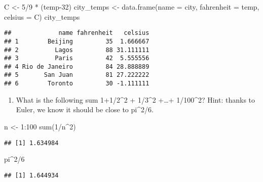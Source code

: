 \documentclass[
]{article}
\newenvironment{Shaded}{\begin{snugshade}}{\end{snugshade}}
\newcommand{\AttributeTok}[1]{\textcolor[rgb]{0.77,0.63,0.00}{#1}}
\newcommand{\DecValTok}[1]{\textcolor[rgb]{0.00,0.00,0.81}{#1}}
\newcommand{\FunctionTok}[1]{\textcolor[rgb]{0.00,0.00,0.00}{#1}}
\newcommand{\NormalTok}[1]{#1}
\newcommand{\OtherTok}[1]{\textcolor[rgb]{0.56,0.35,0.01}{#1}}
\newcommand{\SpecialCharTok}[1]{\textcolor[rgb]{0.00,0.00,0.00}{#1}}
\providecommand{\tightlist}{%
  \setlength{\itemsep}{0pt}\setlength{\parskip}{0pt}}
\begin{document}
\begin{Shaded}
\begin{Highlighting}[]
\NormalTok{C }\OtherTok{\textless{}{-}} \DecValTok{5}\SpecialCharTok{/}\DecValTok{9} \SpecialCharTok{*}\NormalTok{ (temp}\DecValTok{{-}32}\NormalTok{)}
\NormalTok{city\_temps }\OtherTok{\textless{}{-}} \FunctionTok{data.frame}\NormalTok{(}\AttributeTok{name =}\NormalTok{ city, }\AttributeTok{fahrenheit =}\NormalTok{ temp, }\AttributeTok{celsius =}\NormalTok{ C)}
\NormalTok{city\_temps}
\end{Highlighting}
\end{Shaded}

\begin{verbatim}
##             name fahrenheit   celsius
## 1        Beijing         35  1.666667
## 2          Lagos         88 31.111111
## 3          Paris         42  5.555556
## 4 Rio de Janeiro         84 28.888889
## 5       San Juan         81 27.222222
## 6        Toronto         30 -1.111111
\end{verbatim}

\begin{enumerate}
\def\labelenumi{\arabic{enumi}.}
\setcounter{enumi}{1}
\tightlist
\item
  What is the following sum 1+1/2\^{}2 + 1/3\^{}2 +\ldots+ 1/100\^{}2?
  Hint: thanks to Euler, we know it should be close to pi\^{}2/6.
\end{enumerate}

\begin{Shaded}
\begin{Highlighting}[]
\NormalTok{n }\OtherTok{\textless{}{-}} \DecValTok{1}\SpecialCharTok{:}\DecValTok{100}
\FunctionTok{sum}\NormalTok{(}\DecValTok{1}\SpecialCharTok{/}\NormalTok{n}\SpecialCharTok{\^{}}\DecValTok{2}\NormalTok{)}
\end{Highlighting}
\end{Shaded}

\begin{verbatim}
## [1] 1.634984
\end{verbatim}

\begin{Shaded}
\begin{Highlighting}[]
\NormalTok{pi}\SpecialCharTok{\^{}}\DecValTok{2}\SpecialCharTok{/}\DecValTok{6}
\end{Highlighting}
\end{Shaded}

\begin{verbatim}
## [1] 1.644934
\end{verbatim}
\end{document}
